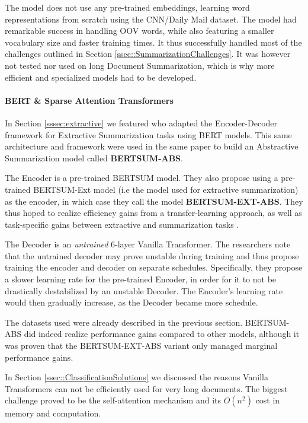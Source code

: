 \documentclass[preprint,review,12pt]{elsarticle}
\begin{document}
The model does not use any pre-trained embeddings, learning word representations from scratch using the CNN/Daily Mail dataset. The model had remarkable success in handling OOV words, while also featuring a smaller vocabulary size and faster training times. It thus successfully handled most of the challenges outlined in Section \ref{ssec::SummarizationChallenges}. It was however not tested nor used on long Document Summarization, which is why more efficient and specialized models had to be developed.


\paragraph{BERT \& Sparse Attention Transformers}  In Section \ref{sssec:extractive} we featured \citet{lapata_bert} who adapted the Encoder-Decoder framework for Extractive Summarization tasks using BERT models. This same architecture and framework were used in the same paper to build an Abstractive Summarization model called \textbf{BERTSUM-ABS}.

The Encoder is a pre-trained BERTSUM model. They also propose using a pre-trained BERTSUM-Ext model (i.e the model used for extractive summarization) as the encoder, in which case they call the model \textbf{BERTSUM-EXT-ABS}. They thus hoped to realize efficiency gains from a transfer-learning approach, as well as task-specific gains between extractive and summarization tasks \cite{wei2, gehrmann}.

The Decoder is an \textit{untrained} 6-layer Vanilla Transformer. The researchers note that the untrained decoder may prove unstable during training and thus propose training the encoder and decoder on separate schedules. Specifically, they propose a slower learning rate for the pre-trained Encoder, in order for it to not be drastically destabilized by an unstable Decoder. The Encoder's learning rate would then gradually increase, as the Decoder became more schedule.

The datasets used were already described in the previous section. BERTSUM-ABS did indeed realize performance gains compared to other models, although it was proven that the BERTSUM-EXT-ABS variant only managed marginal performance gains.

In Section \ref{ssec::ClassificationSolutions} we discussed the reasons Vanilla Transformers can not be efficiently used for very long documents. The biggest challenge proved to be the self-attention mechanism and its $O(n^{2})$ cost in memory and computation.
\end{document}

